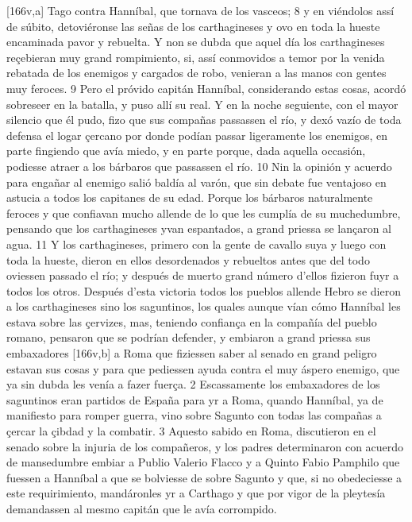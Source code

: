 \documentclass[11pt,twoside]{article}\makeatletter
\def\persName{}\def\name{}
\def\placeName{}
\begin{document}
[166v,a] Tago contra  {\persName Hanníbal}, que tornava de los vasceos; 8 y en viéndolos assí de súbito, detoviéronse las señas de los  {\name carthagineses} y ovo en toda la hueste encaminada pavor y rebuelta. Y non se dubda que aquel día los  {\name carthagineses} reçebieran muy grand rompimiento, si, assí conmovidos a temor por la venida rebatada de los enemigos y cargados de robo, venieran a las manos con gentes muy feroces. 9 Pero el próvido capitán  {\persName Hanníbal}, considerando estas cosas, acordó sobreseer en la batalla, y puso allí su real. Y en la noche seguiente, con el mayor silencio que él pudo, fizo que sus compañas passassen el río, y dexó vazío de toda defensa el logar çercano por donde podían passar ligeramente los enemigos, en parte fingiendo que avía miedo, y en parte porque, dada aquella occasión, podiesse atraer a los bárbaros que passassen el río. 10 Nin la opinión y acuerdo para engañar al enemigo salió baldía al varón, que sin debate fue ventajoso en astucia a todos los capitanes de su edad. Porque los bárbaros naturalmente feroces y que confiavan mucho allende de lo que les cumplía de su muchedumbre, pensando que los  {\name carthagineses} yvan espantados, a grand priessa se lançaron al agua. 11 Y los  {\name carthagineses}, primero con la gente de cavallo suya y luego con toda la hueste, dieron en ellos desordenados y rebueltos antes que del todo oviessen passado el río; y después de muerto grand número d'ellos fizieron fuyr a todos los otros.
\pend
{} Después d'esta victoria todos los pueblos allende Hebro se dieron a los  {\name carthagineses} sino los  {\name saguntinos}, los quales aunque vían cómo  {\persName Hanníbal} les estava sobre las çervizes, mas, teniendo confiança en la compañía del pueblo romano, pensaron que se podrían defender, y embiaron a grand priessa sus embaxadores %
[166v,b] a  {\placeName Roma} que fiziessen saber al senado en  grand peligro estavan sus cosas y para que pediessen ayuda contra el muy áspero enemigo, que ya sin dubda les venía a fazer fuerça. 2 Escassamente los embaxadores de los  {\name saguntinos} eran partidos de  {\placeName España} para yr a  {\placeName Roma}, quando  {\persName Hanníbal}, ya de manifiesto para romper guerra, vino sobre  {\placeName Sagunto} con todas las compañas a çercar la çibdad y la combatir. 3 Aquesto sabido en  {\placeName Roma}, discutieron en el senado sobre la injuria de los compañeros, y los padres determinaron con acuerdo de mansedumbre embiar a  {\persName Publio Valerio Flacco} y a  {\persName Quinto Fabio Pamphilo} que fuessen a  {\persName Hanníbal} a que se bolviesse de sobre  {\placeName Sagunto} y que, si no obedeciesse a este requirimiento, mandáronles yr a  {\placeName Carthago} y que por vigor de la pleytesía demandassen al mesmo capitán que le avía corrompido.
\end{document}
